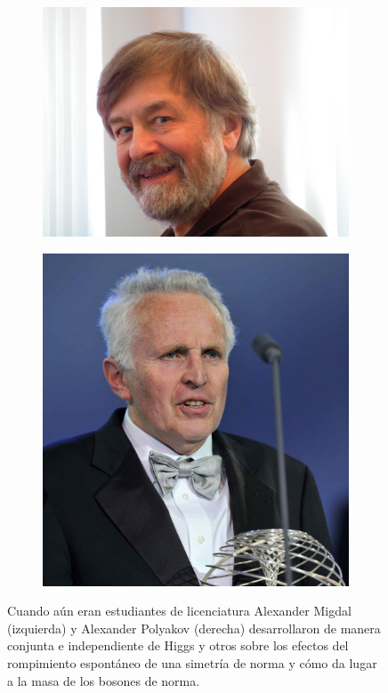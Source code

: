 \documentclass[12pt,a4paper]{report}
\begin{document}
\begin{figure}
\begin{subfigure}{0.5\textwidth}
	\includegraphics[scale=0.18]{images/migdal.jpg}
\end{subfigure}	
\begin{subfigure}{0.5\textwidth}
	\includegraphics[scale=0.15]{images/polyakov.jpg}
\end{subfigure}	
\caption{Cuando a\'un eran estudiantes de licenciatura Alexander Migdal (izquierda) y Alexander Polyakov (derecha) desarrollaron de manera conjunta e independiente de Higgs y otros sobre los efectos del rompimiento espont\'aneo de una simetr\'ia de norma y c\'omo da lugar a la masa de los bosones de norma.}
\end{figure}
\end{document}
